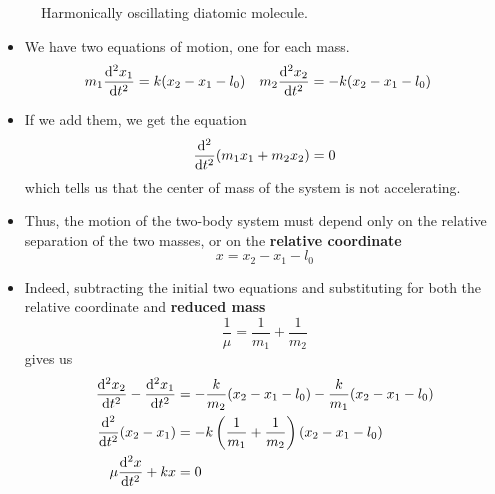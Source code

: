 \documentclass[../notes.tex]{subfiles}
\begin{document}
\begin{itemize}
\begin{figure}[h!]
        \caption{Harmonically oscillating diatomic molecule.}
        \label{fig:harmonicDiatomic}
    \end{figure}
    \begin{itemize}
        \item We have two equations of motion, one for each mass.
        \begin{align*}
            m_1\dv[2]{x_1}{t} &= k(x_2-x_1-l_0)&
                m_2\dv[2]{x_2}{t} &= -k(x_2-x_1-l_0)
        \end{align*}
        \item If we add them, we get the equation
        \begin{equation*}
            \dv[2]{t}(m_1x_1+m_2x_2) = 0
        \end{equation*}
        which tells us that the center of mass of the system is not accelerating.
        \item Thus, the motion of the two-body system must depend only on the relative separation of the two masses, or on the \textbf{relative coordinate}
        \begin{equation*}
            x = x_2-x_1-l_0
        \end{equation*}
        \item Indeed, subtracting the initial two equations and substituting for both the relative coordinate and \textbf{reduced mass}
        \begin{equation*}
            \frac{1}{\mu} = \frac{1}{m_1}+\frac{1}{m_2}
        \end{equation*}
        gives us
        \begin{align*}
            \dv[2]{x_2}{t}-\dv[2]{x_1}{t} &= -\frac{k}{m_2}(x_2-x_1-l_0)-\frac{k}{m_1}(x_2-x_1-l_0)\\
            \dv[2]{t}(x_2-x_1) &= -k\left( \frac{1}{m_1}+\frac{1}{m_2} \right)(x_2-x_1-l_0)\\
            \mu\dv[2]{x}{t}+kx &= 0
        \end{align*}

\end{itemize}
\end{itemize}
\end{document}
